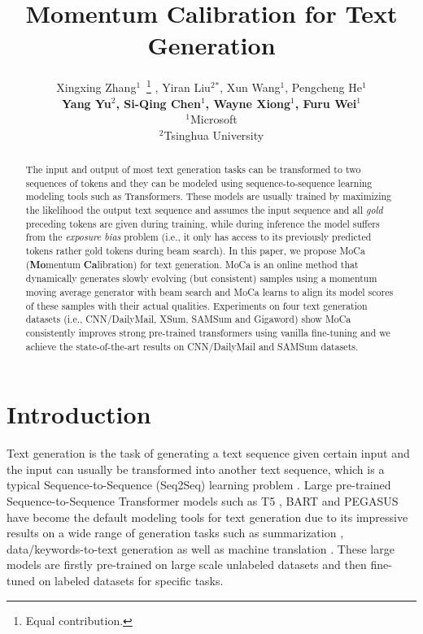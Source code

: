 \documentclass{article}
\title{Momentum Calibration for Text Generation}
\author{Xingxing Zhang$^{1}$~\thanks{Equal contribution.} , Yiran Liu$^{2}$$^*$, Xun Wang$^{1}$, Pengcheng He$^{1}$ \\
 {\bf Yang Yu$^{2}$, Si-Qing Chen$^{1}$, Wayne Xiong$^{1}$, Furu Wei$^{1}$} \\
 $^{1}$Microsoft \\
 $^{2}$Tsinghua University \\
}
\begin{document}
\maketitle

\begin{abstract}
The input and output of most text generation tasks can be transformed to two sequences of tokens and they can be modeled using sequence-to-sequence learning modeling tools such as Transformers. These models are usually trained by maximizing the likelihood the output text sequence and assumes the input sequence and all \emph{gold} preceding tokens are given during training, while during inference the model suffers from the \emph{exposure bias} problem (i.e., it only has access to its previously predicted tokens rather gold tokens during beam search). In this paper, we propose MoCa ({\bf Mo}mentum {\bf Ca}libration) for text generation. MoCa is an online method that dynamically generates slowly evolving (but consistent) samples using a momentum moving average generator with beam search and MoCa learns to align its model scores of these samples with their actual qualities. Experiments on four text generation datasets (i.e., CNN/DailyMail, XSum, SAMSum and Gigaword) show MoCa consistently improves strong pre-trained transformers using vanilla fine-tuning and we achieve the state-of-the-art results on CNN/DailyMail and SAMSum datasets.

\end{abstract}



\section{Introduction}
Text generation is the task of generating a text sequence given certain input and the input can usually be transformed into another text sequence, which is a typical Sequence-to-Sequence (Seq2Seq) learning problem \cite{sutskever2014sequence}.
Large pre-trained Sequence-to-Sequence Transformer models such as T5 \cite{raffel2020exploring}, BART \cite{lewis-etal-2020-bart} and PEGASUS \cite{zhang:2019:icml} have become the default modeling tools for text generation due to its impressive results on a wide range of generation tasks such as summarization \cite{lewis-etal-2020-bart,zhang:2019:icml}, data/keywords-to-text generation \cite{lin2019commongen} as well as machine translation \cite{liu2020multilingual}. These large models are firstly pre-trained on large scale unlabeled datasets and then fine-tuned on labeled datasets for specific tasks.
\end{document}
